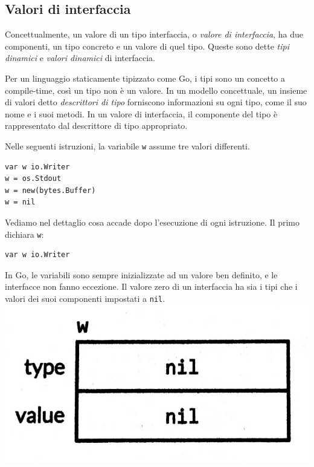 \documentclass[../../thesis.tex]{subfiles}
\begin{document}
    \subsection{Valori di interfaccia}\label{subsec:valori-di-interfaccia}
    Concettualmente, un valore di un tipo interfaccia, o \textit{valore di interfaccia}, ha due componenti, un tipo concreto e un valore di quel tipo.
    Queste sono dette \textit{tipi dinamici} e \textit{valori dinamici} di interfaccia.
    \hfill \vspace{12pt}

    Per un linguaggio staticamente tipizzato come Go, i tipi sono un concetto a compile-time, così un tipo non è un valore.
    In un modello concettuale, un insieme di valori detto \textit{descrittori di tipo} forniscono informazioni su ogni tipo, come il suo nome e i suoi metodi.
    In un valore di interfaccia, il componente del tipo è rappresentato dal descrittore di tipo appropriato.
    \hfill \vspace{12pt}

    Nelle seguenti istruzioni, la variabile \verb"w" assume tre valori differenti.
    \begin{lstlisting}[frame = single, label = {lst:lstlisting6-5.1}]
var w io.Writer
w = os.Stdout
w = new(bytes.Buffer)
w = nil
    \end{lstlisting}
    Vediamo nel dettaglio cosa accade dopo l'esecuzione di ogni istruzione.
    Il primo dichiara \verb"w":
    \begin{lstlisting}[frame = single, label = {lst:lstlisting6-5.2}]
var w io.Writer
    \end{lstlisting}
    In Go, le variabili sono sempre inizializzate ad un valore ben definito, e le interfacce non fanno eccezione.
    Il valore zero di un interfaccia ha sia i tipi che i valori dei suoi componenti impostati a \verb"nil".
    \center\includegraphics[scale = 0.125]{figura-7.1}
\end{document}
